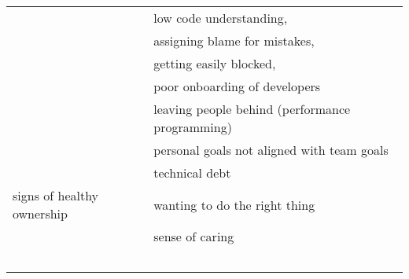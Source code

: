 \documentclass{sig-alternate-05-2015}
\begin{document}
\begin{table*}[]
\begin{tabular}{p{1.5in}p{5.6in}}
                           & low code understanding,                                                                                                                            \\
                           & assigning blame for mistakes,                                                                                                                      \\
                           & getting easily blocked,                                                                                                                            \\
                           & poor onboarding of developers                                                                                                                      \\
                           & leaving people behind (performance programming)                                                                                                    \\
                           & personal goals not aligned with team goals                                                                                                         \\
                           & technical debt                                                                                                                                     \\
\hline
signs of healthy ownership & wanting to do the right thing  \\
                           & sense of caring                                                                                                                                    \\
                           &                                                                                                                                                    \\
                           &                                                                                                                                                    \\
                           &                                                                                                                                                    \\
                           &                                                                                                                                                    \\
                           &                                                                                                                                                   
\end{tabular}
\end{table*}
\end{document}
